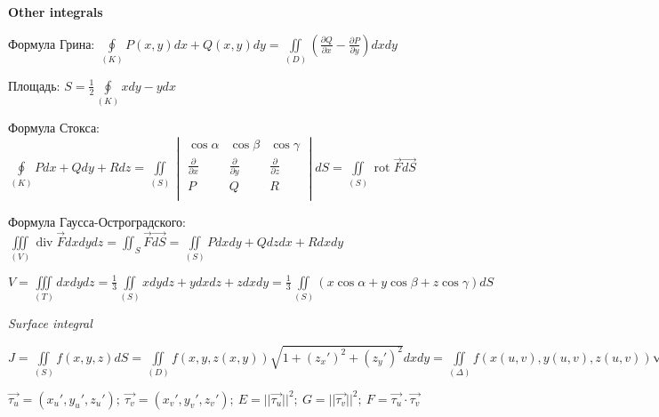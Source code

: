 \begin{center}
    \textbf{Other integrals}
\end{center}

Формула Грина: $\displaystyle\oint\limits_{(K)}P(x, y)dx + Q(x, y)dy = \iint\limits_{(D)}\left(\frac{\partial Q}{\partial x} - \frac{\partial P}{\partial y}\right)dxdy$

Площадь: $S = \frac{1}{2}\oint\limits_{(K)}xdy - ydx$

Формула Стокса: $\displaystyle \oint\limits_{(K)} Pdx + Qdy + Rdz = \iint\limits_{(S)}\begin{vmatrix}
    \cos{\alpha} & \cos{\beta} & \cos{\gamma} \\
    \frac{\partial}{\partial{x}} & \frac{\partial}{\partial{y}} & \frac{\partial}{\partial{z}} \\
    P & Q & R \\
\end{vmatrix}dS =  \iint\limits_{(S)} \operatorname{rot}\vec{F} \vec{dS}$ 

Формула Гаусса-Остроградского: $\displaystyle \iiint\limits_{(V)} \operatorname{div}\vec{F}dxdydz = \iint_S \vec{F}\vec{dS} = \iint\limits_{(S)}Pdxdy + Qdzdx + Rdxdy$ 

$\displaystyle V = \iiint\limits_{(T)}dxdydz = \frac{1}{3}\iint\limits_{(S)}xdydz+ydxdz+zdxdy = \frac{1}{3}\iint\limits_{(S)}(x\cos{\alpha} + y\cos{\beta} + z\cos{\gamma})dS$

\vspace{2ex}
\textit{Surface integral}

$\displaystyle J = \iint\limits_{(S)}f(x, y, z)dS = \iint\limits_{(D)}f(x, y, z(x, y))\sqrt{1+(z_x')^2+(z_y')^2}dxdy = \iint\limits_{(\Delta)}f(x(u,v),y(u,v),z(u,v))\sqrt{EG - F^2}dudv$

$\displaystyle \vec{\tau_u} = (x_u',y_u',z_u'); ~\vec{\tau_v} = (x_v',y_v',z_v'); ~E = ||\vec{\tau_u}||^2; ~G = ||\vec{\tau_v}||^2; ~F = \vec{\tau_u} \cdot \vec{\tau_v}$
























